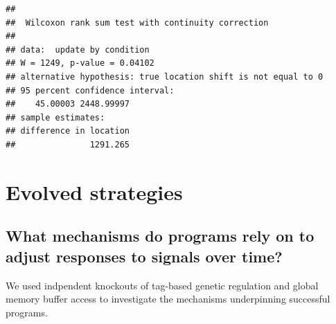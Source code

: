 \documentclass[
]{book}
\begin{document}
\begin{verbatim}
## 
##  Wilcoxon rank sum test with continuity correction
## 
## data:  update by condition
## W = 1249, p-value = 0.04102
## alternative hypothesis: true location shift is not equal to 0
## 95 percent confidence interval:
##    45.00003 2448.99997
## sample estimates:
## difference in location 
##               1291.265
\end{verbatim}

\hypertarget{evolved-strategies-1}{%
\section{Evolved strategies}\label{evolved-strategies-1}}

\hypertarget{what-mechanisms-do-programs-rely-on-to-adjust-responses-to-signals-over-time-1}{%
\subsection{What mechanisms do programs rely on to adjust responses to signals over time?}\label{what-mechanisms-do-programs-rely-on-to-adjust-responses-to-signals-over-time-1}}

We used indpendent knockouts of tag-based genetic regulation and global memory buffer access to investigate the mechanisms underpinning successful programs.
\end{document}
